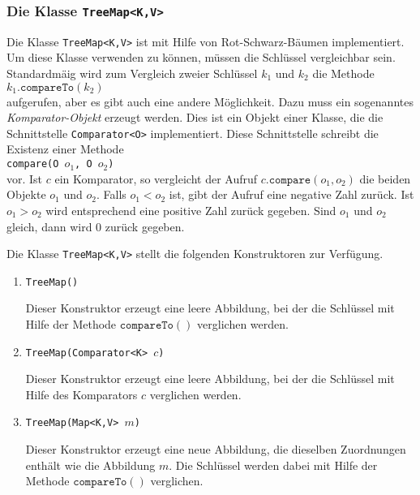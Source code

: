 \subsubsection{Die Klasse \texttt{TreeMap<K,V>}}
Die Klasse \texttt{TreeMap<K,V>} ist mit Hilfe von Rot-Schwarz-B\"aumen implementiert.  Um diese
Klasse verwenden zu k\"onnen, m\"ussen die Schl\"ussel vergleichbar sein.  Standardm\"a\3ig wird
zum Vergleich zweier Schl\"ussel $k_1$ und $k_2$ die Methode
\\[0.2cm]
\hspace*{1.3cm} $k_1.\mathtt{compareTo}(k_2)$
\\[0.2cm]
aufgerufen, aber es gibt auch eine andere M\"oglichkeit.  Dazu muss ein sogenanntes
\emph{Komparator-Objekt} erzeugt werden.  Dies ist ein Objekt einer Klasse, die die Schnittstelle
\texttt{Comparator<O>} implementiert.  Diese Schnittstelle schreibt die Existenz einer
Methode
\\[0.2cm]
\hspace*{1.3cm} \texttt{compare(O $o_1$, O $o_2$)} \\[0.2cm]
vor.  Ist $c$ ein Komparator, so vergleicht der Aufruf $c.\mathtt{compare}(o_1, o_2)$ die
beiden Objekte $o_1$ und $o_2$.  Falls $o_1 < o_2$ ist, gibt der Aufruf eine negative Zahl
zur\"uck.  Ist $o_1 > o_2$ wird entsprechend eine positive Zahl zur\"uck gegeben.  Sind $o_1$
und $o_2$ gleich, dann wird 0 zur\"uck gegeben.

Die Klasse \texttt{TreeMap<K,V>} stellt die folgenden Konstruktoren zur Verf\"ugung.
\begin{enumerate}
\item \texttt{TreeMap()}

      Dieser Konstruktor erzeugt eine leere Abbildung, bei der die Schl\"ussel mit Hilfe der
      Methode $\mathtt{compareTo}()$ verglichen werden.
\item \texttt{TreeMap(Comparator<K> $c$)}
  
      Dieser Konstruktor erzeugt eine leere Abbildung, bei der die Schl\"ussel mit Hilfe des
      Komparators $c$ verglichen werden.
\item \texttt{TreeMap(Map<K,V> $m$)}

      Dieser Konstruktor erzeugt eine neue Abbildung, die dieselben Zuordnungen enth\"alt 
      wie die Abbildung $m$.  Die Schl\"ussel werden dabei mit Hilfe der
      Methode $\mathtt{compareTo}()$ verglichen.
\end{enumerate}

